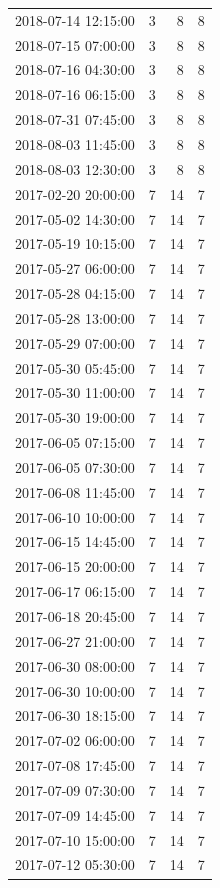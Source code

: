 \begin{tabular}{lrrr}
2018-07-14 12:15:00 & 3 & 8 & 8 \\
2018-07-15 07:00:00 & 3 & 8 & 8 \\
2018-07-16 04:30:00 & 3 & 8 & 8 \\
2018-07-16 06:15:00 & 3 & 8 & 8 \\
2018-07-31 07:45:00 & 3 & 8 & 8 \\
2018-08-03 11:45:00 & 3 & 8 & 8 \\
2018-08-03 12:30:00 & 3 & 8 & 8 \\
2017-02-20 20:00:00 & 7 & 14 & 7 \\
2017-05-02 14:30:00 & 7 & 14 & 7 \\
2017-05-19 10:15:00 & 7 & 14 & 7 \\
2017-05-27 06:00:00 & 7 & 14 & 7 \\
2017-05-28 04:15:00 & 7 & 14 & 7 \\
2017-05-28 13:00:00 & 7 & 14 & 7 \\
2017-05-29 07:00:00 & 7 & 14 & 7 \\
2017-05-30 05:45:00 & 7 & 14 & 7 \\
2017-05-30 11:00:00 & 7 & 14 & 7 \\
2017-05-30 19:00:00 & 7 & 14 & 7 \\
2017-06-05 07:15:00 & 7 & 14 & 7 \\
2017-06-05 07:30:00 & 7 & 14 & 7 \\
2017-06-08 11:45:00 & 7 & 14 & 7 \\
2017-06-10 10:00:00 & 7 & 14 & 7 \\
2017-06-15 14:45:00 & 7 & 14 & 7 \\
2017-06-15 20:00:00 & 7 & 14 & 7 \\
2017-06-17 06:15:00 & 7 & 14 & 7 \\
2017-06-18 20:45:00 & 7 & 14 & 7 \\
2017-06-27 21:00:00 & 7 & 14 & 7 \\
2017-06-30 08:00:00 & 7 & 14 & 7 \\
2017-06-30 10:00:00 & 7 & 14 & 7 \\
2017-06-30 18:15:00 & 7 & 14 & 7 \\
2017-07-02 06:00:00 & 7 & 14 & 7 \\
2017-07-08 17:45:00 & 7 & 14 & 7 \\
2017-07-09 07:30:00 & 7 & 14 & 7 \\
2017-07-09 14:45:00 & 7 & 14 & 7 \\
2017-07-10 15:00:00 & 7 & 14 & 7 \\
2017-07-12 05:30:00 & 7 & 14 & 7 \\

\end{tabular}
